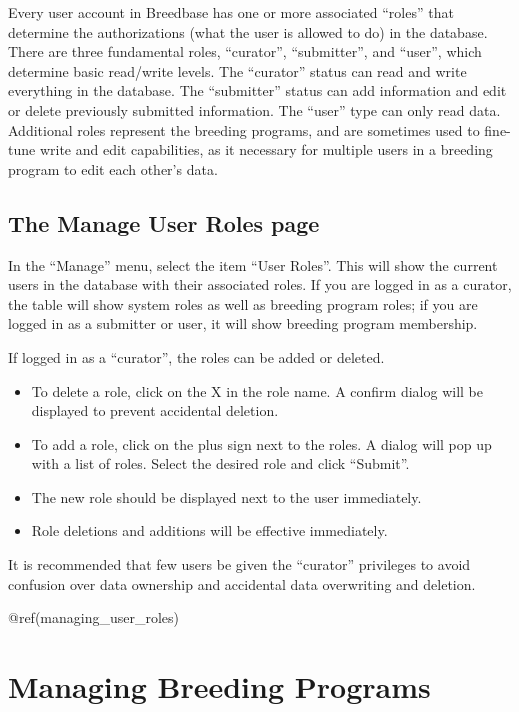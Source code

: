 \documentclass[
  12pt,
]{book}
\providecommand{\tightlist}{%
  \setlength{\itemsep}{0pt}\setlength{\parskip}{0pt}}
\begin{document}
Every user account in Breedbase has one or more associated ``roles'' that determine the authorizations (what the user is allowed to do) in the database. There are three fundamental roles, ``curator'', ``submitter'', and ``user'', which determine basic read/write levels. The ``curator'' status can read and write everything in the database. The ``submitter'' status can add information and edit or delete previously submitted information. The ``user'' type can only read data. Additional roles represent the breeding programs, and are sometimes used to fine-tune write and edit capabilities, as it necessary for multiple users in a breeding program to edit each other's data.

\hypertarget{the-manage-user-roles-page}{%
\section{The Manage User Roles page}\label{the-manage-user-roles-page}}

In the ``Manage'' menu, select the item ``User Roles''. This will show the current users in the database with their associated roles. If you are logged in as a curator, the table will show system roles as well as breeding program roles; if you are logged in as a submitter or user, it will show breeding program membership.

If logged in as a ``curator'', the roles can be added or deleted.

\begin{itemize}
\tightlist
\item
  To delete a role, click on the X in the role name. A confirm dialog will be displayed to prevent accidental deletion.
\item
  To add a role, click on the plus sign next to the roles. A dialog will pop up with a list of roles. Select the desired role and click ``Submit''.
\item
  The new role should be displayed next to the user immediately.
\item
  Role deletions and additions will be effective immediately.
\end{itemize}

It is recommended that few users be given the ``curator'' privileges to avoid confusion over data ownership and accidental data overwriting and deletion.

@ref(managing\_user\_roles)

\hypertarget{managing-breeding-programs}{%
\chapter{Managing Breeding Programs}\label{managing-breeding-programs}}
\end{document}
